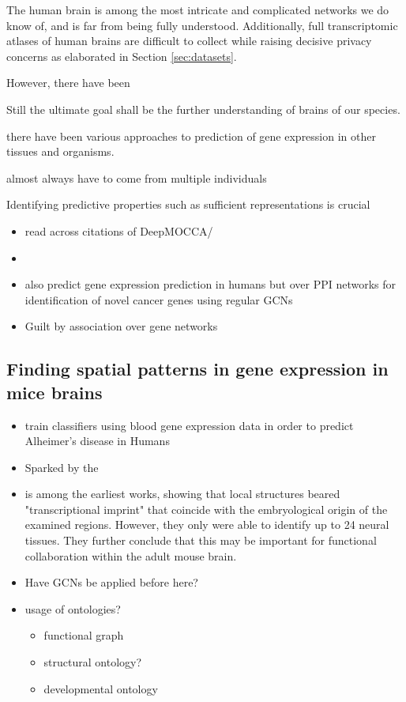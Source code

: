 \documentclass[]{article}
\renewcommand{\cite}{\citep}
\begin{document}
The human brain is among the most intricate and complicated networks we do know of, and is far from being fully understood. Additionally, full transcriptomic atlases of human brains are difficult to collect while raising decisive privacy concerns as elaborated in Section \ref{sec:datasets}. 

However, there have been 


Still the ultimate goal shall be the further understanding of brains of our species.

 there have been various approaches to prediction of gene expression in other tissues and organisms. 



almost always have to come from multiple individuals




Identifying predictive properties such as sufficient representations is crucial 

\begin{itemize}


	\item read across citations of DeepMOCCA/\citet{takata_flexible_2021}
	\item 
	\item \cite{schulte2021integration} also predict gene expression prediction in humans but over PPI networks for identification of novel cancer genes using regular GCNs
	\item Guilt by association over gene networks \cite{Oliver2000, Gillis2012}
\end{itemize}

\subsection{Finding spatial patterns in gene expression in mice brains}
\label{sec:relatedwork_micebrains}

\begin{itemize}
	\item \cite{lee2020prediction} train classifiers using blood gene expression data in order to predict Alheimer's disease in Humans
	\item Sparked by the \citet{MouseBrainAtlas}
	\item \cite{zapala2005adult} is among the earliest works, showing that local structures beared "transcriptional imprint" that coincide with the embryological origin of the examined regions. However, they only were able to identify up to 24 neural tissues. They further conclude that this may be important for functional collaboration within the adult mouse brain.
\end{itemize}
\begin{itemize}
	\item Have GCNs be applied before here?
	\item usage of ontologies?
	\begin{itemize}
		\item functional graph \cite{ValkShapingBrainStructure2020}
		\item structural ontology?
		\item developmental ontology
	\end{itemize}
\end{itemize}
\end{document}
